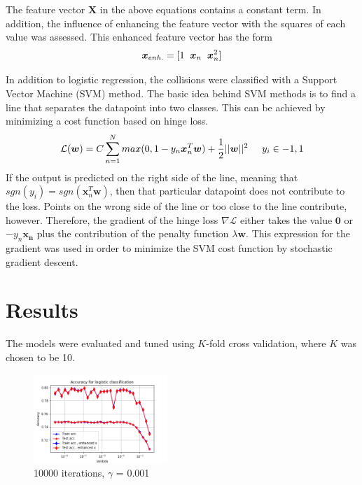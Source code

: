 \documentclass[10pt,conference,compsocconf]{IEEEtran}
\begin{document}
The feature vector $\boldsymbol{X}$ in the above equations contains a constant term. In addition, the influence of enhancing the feature vector with the squares of each value was assessed. This enhanced feature vector has the form
\begin{equation}
\boldsymbol{x}_{enh.} = [1 \hspace{2mm} \boldsymbol{x}_n \hspace{2mm} \boldsymbol{x}_n^2]
\end{equation}
\par
In addition to logistic regression, the collisions were classified with a Support Vector Machine (SVM) method. The basic idea behind SVM methods is to find a line that separates the datapoint into two classes. This can be achieved by minimizing a cost function based on hinge loss.
\begin{equation}
\mathcal{L}(\boldsymbol{w}) = C \sum_{n=1}^N max(0,1-y_n \boldsymbol{x}_n^T\boldsymbol{w}) + \frac{1}{2}||\boldsymbol{w}||^2 \hspace{5mm} y_i \in {-1,1}
\end{equation}  
If the output is predicted on the right side of the line, meaning that $sgn(y_i) = sgn(\boldsymbol{x}_n^T\boldsymbol{w})$, then that particular datapoint does not contribute to the loss. Points on the wrong side of the line or too close to the line contribute, however. Therefore, the gradient of the hinge loss $\nabla \mathcal{L}$ either takes the value $\boldsymbol{0}$ or $-y_n\boldsymbol{x_n}$ plus the contribution of the penalty function $\lambda \boldsymbol{w}$. This expression for the gradient was used in order to minimize the SVM cost function by stochastic gradient descent.  

\section*{Results}
The models were evaluated and tuned using $K$-fold cross validation, where $K$ was chosen to be 10.
\begin{figure}[H]
	\centering
	\includegraphics[width=0.45\textwidth]{accuracy_logistic.png}
	\caption{10000 iterations, $\gamma$ = 0.001}
\end{figure}
\end{document}
